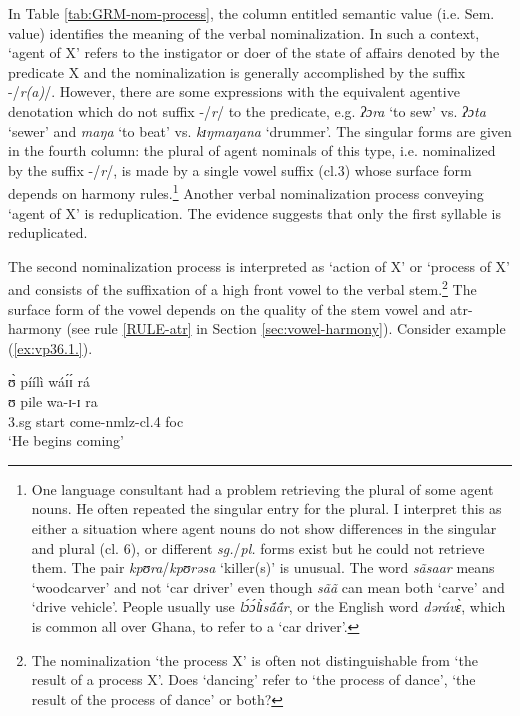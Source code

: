 \begin{exe}
\begin{exe}
\begin{exe}
{\begin{exe}
\begin{exe}
\begin{exe}
\begin{exe}
 In Table \ref{tab:GRM-nom-process}, the column entitled semantic value (i.e.
Sem. value)  identifies the meaning of the verbal nominalization. In such a
context, `agent of X'  refers to the instigator or doer of the state of affairs
denoted by  the predicate X and
the nominalization is generally accomplished by the suffix -/{\it r(a)}/.  
However,  there are some expressions with the equivalent
agentive denotation which
do
not suffix    -/{\it r}/  to the  predicate, e.g.  {\it ʔɔra} `to sew' vs.
{\it ʔɔta} `sewer' and {\it maŋa} `to beat' vs.  {\it kɪŋmaŋana} `drummer'.  The
singular forms  are given in the fourth column: 
the plural of agent nominals  of
this type, i.e. nominalized by the suffix -/{\it r}/, is made by  a single vowel
suffix  ({\sc cl.3}) whose surface
form  depends on harmony rules.\footnote{One language consultant
had a problem retrieving the plural of some agent nouns. He often repeated the
singular entry
for the plural. I interpret this as  either a situation where agent nouns do
not show differences in the singular and plural ({\sc cl. 6}), or different {\it
sg.}/{\it pl.}
forms exist but he could not retrieve them. The pair {\it kpʊra}/{\it kpʊrəsa}
`killer(s)'   is unusual.  The word {\it  sãsaar} means
`woodcarver' and not `car driver'  even though {\it sãã} can mean both `carve'
and `drive vehicle'.  People usually use  {\it lɔ́ɔ́lɪ̀sã́ã́r}, or the English
word {\it dərávɛ̀}, 
 which is common all over Ghana, to refer to a `car driver'. } Another verbal
nominalization process conveying `agent of X' is reduplication. The evidence
suggests that  only the first syllable  is reduplicated.

The second nominalization process is  interpreted as `action of X' or
`process of X' and
consists of the suffixation of a  high front vowel to the verbal
 stem.\footnote{The nominalization `the process X' is often not distinguishable 
from
`the result of a process X'.  Does `dancing'  refer to `the process of dance', 
`the result of the process of dance' or both?} The surface form of the vowel
depends
on the quality of the stem vowel and {\sc atr}-harmony  (see
rule \ref{RULE-atr} in Section \ref{sec:vowel-harmony}). 
Consider example (\ref{ex:vp36.1.}).


\ea\label{ex:vp36.1.}
\glll ʊ̀ píílì wáɪ́ɪ́ rá \\
ʊ pile wa-ɪ-ɪ ra \\
        {\sc 3.sg} start come-{\sc nmlz}-{\sc cl.4} {\sc foc}\\
\glt  `He begins coming' 
\z


\end{exe}
\end{exe}
\end{exe}
\end{exe}}
\end{exe}
\end{exe}
\end{exe}

